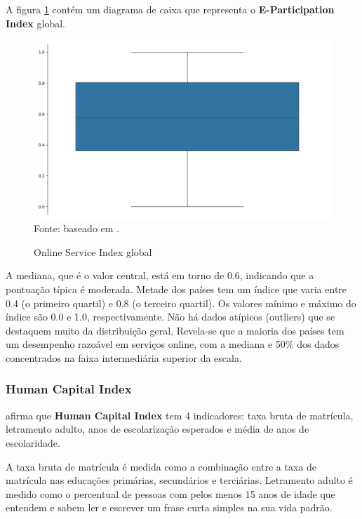 A figura \ref{fig:boxplot_osi_global} contém um diagrama de caixa que representa o \textbf{E-Participation Index} global.

\begin{figure}[H]
	\centering
	\caption{Online Service Index global}
	\includegraphics[width=1\linewidth]{figuras/egdi/boxplot_osi_global.png}
	\label{fig:boxplot_osi_global}
	\footnotesize{Fonte: baseado em \cite{ONU_edgi_mapa}.}
\end{figure}

A mediana, que é o valor central, está em torno de 0.6, indicando que a pontuação típica é moderada. Metade dos países tem um índice que varia entre 0.4 (o primeiro quartil) e 0.8 (o terceiro quartil). Os valores mínimo e máximo do índice são 0.0 e 1.0, respectivamente.
Não há dados atípicos (outliers) que se destaquem muito da distribuição geral. Revela-se que a maioria dos países tem um desempenho razoável em serviços online, com a mediana e 50\% dos dados concentrados na faixa intermediária superior da escala.

\subsubsection{Human Capital Index}
\label{hci}

\cite{ONU_egdi_methodology} afirma que \textbf{Human Capital Index} tem 4 indicadores: taxa bruta de matrícula, letramento adulto, anos de escolarização esperados e média de anos de escolaridade. 

A taxa bruta de matrícula é medida como a combinação entre a taxa de matrícula nas educações primárias, secundários e terciárias. Letramento adulto é medido como o percentual de pessoas com pelos menos 15 anos de idade que entendem e sabem ler e escrever um frase curta simples na sua vida padrão.

